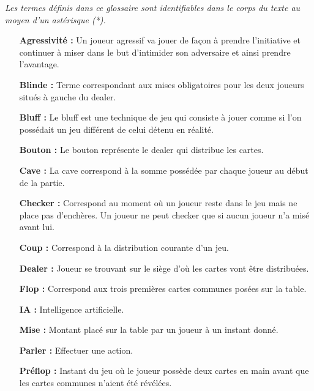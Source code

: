 \documentclass{report}
\begin{document}
	\textit{Les termes définis dans ce glossaire sont identifiables dans le corps du texte au moyen d'un astérisque (*).}
	\bigbreak
	\begin{itemize}
	
		\item[\textbf{Agressivité : }]	Un joueur agressif va jouer de façon à prendre l'initiative et continuer à miser dans le but d'intimider son adversaire et ainsi prendre l'avantage.	\medskip
		
		\item[\textbf{Blinde : }]Terme correspondant aux mises obligatoires pour les deux joueurs situés à gauche du dealer.\medskip
	
		\item[\textbf{Bluff : }]Le bluff est une technique de jeu qui consiste à jouer comme si l'on possédait un jeu différent de celui détenu en réalité.\medskip	
		
		\item[\textbf{Bouton : }]Le bouton représente le dealer qui distribue les cartes.\medskip
		
		\item[\textbf{Cave : }]La cave correspond à la somme possédée par chaque joueur au début de la partie.\medskip		

		\item[\textbf{Checker : }]Correspond au moment où un joueur reste dans le jeu mais ne place pas d'enchères. Un joueur ne peut checker que si aucun joueur n'a misé avant lui.\medskip
		
		\item[\textbf{Coup : }]Correspond à la distribution courante d'un jeu.\medskip		
		
		\item[\textbf{Dealer : }]Joueur se trouvant sur le siège d'où les cartes vont être distribuées.\medskip		
		
		\item[\textbf{Flop : }]Correspond aux trois premières cartes communes posées sur la table.\medskip
		
		\item[\textbf{IA  : }]Intelligence artificielle.
		
		\item[\textbf{Mise : }]Montant placé sur la table par un joueur à un instant donné.\medskip		
		
		\item[\textbf{Parler :}]Effectuer une action.\medskip
		
		\item[\textbf{Préflop : }]Instant du jeu où le joueur possède deux cartes en main avant que les cartes communes n'aient été révélées.\medskip	
		

\end{itemize}
\end{document}
